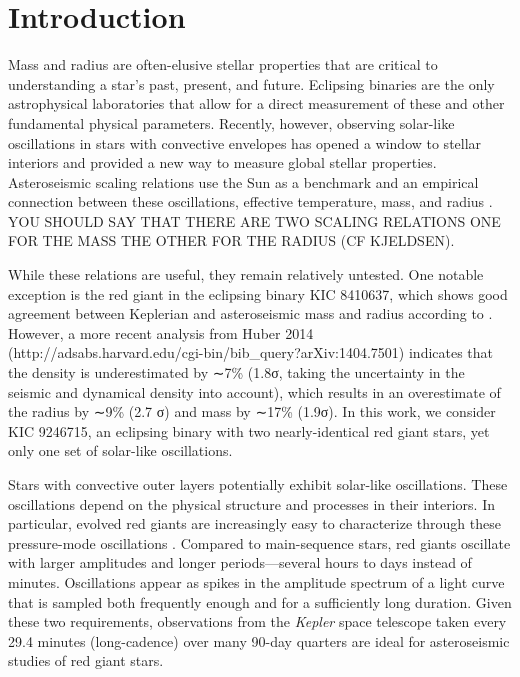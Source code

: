 
\section{Introduction}\label{intro}

Mass and radius are often-elusive stellar properties that are critical to understanding a star's past, present, and future. Eclipsing binaries are the only astrophysical laboratories that allow for a direct measurement of these and other fundamental physical parameters. Recently, however, observing solar-like oscillations in stars with convective envelopes has opened a window to stellar interiors and provided a new way to measure global stellar properties. Asteroseismic scaling relations use the Sun as a benchmark and an empirical connection between these oscillations, effective temperature, mass, and radius \citep{kje95,hub10,mos13}. YOU SHOULD SAY THAT THERE ARE TWO SCALING RELATIONS ONE FOR THE MASS THE OTHER FOR THE RADIUS (CF KJELDSEN). 

While these relations are useful, they remain relatively untested. One notable exception is the red giant in the eclipsing binary KIC 8410637, which shows good agreement between Keplerian and asteroseismic mass and radius according to \citet{fra13}. However, a more recent analysis from Huber 2014 (http://adsabs.harvard.edu/cgi-bin/bib_query?arXiv:1404.7501) indicates that the density is underestimated by ∼7\% (1.8σ, taking
the uncertainty in the seismic and dynamical density into account), which results
in an overestimate of the radius by ∼9\% (2.7 σ) and mass by ∼17\% (1.9σ). In this work, we consider KIC 9246715, an eclipsing binary with two nearly-identical red giant stars, yet only one set of solar-like oscillations.

Stars with convective outer layers potentially exhibit solar-like oscillations. These oscillations depend on the physical structure and processes in their interiors. In particular, evolved red giants are increasingly easy to characterize through these pressure-mode oscillations \citep[for a review of this topic, see][]{cha13}. Compared to main-sequence stars, red giants oscillate with larger amplitudes and longer periods---several hours to days instead of minutes. Oscillations appear as spikes in the amplitude spectrum of a light curve that is sampled both frequently enough and for a sufficiently long duration. Given these two requirements, observations from the \emph{Kepler} space telescope taken every 29.4 minutes (long-cadence) over many 90-day quarters are ideal for asteroseismic studies of red giant stars.

